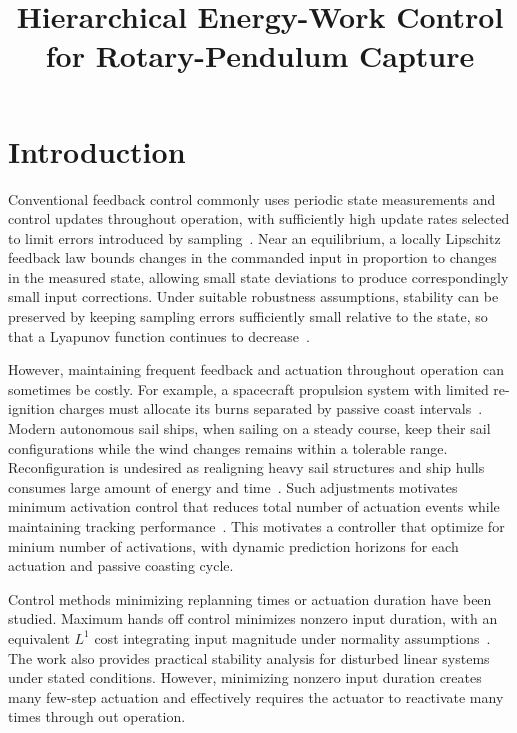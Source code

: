 \documentclass[letterpaper,10pt,conference]{ieeeconf}
\title{\bfseries Hierarchical Energy-Work Control for Rotary-Pendulum Capture}
\author{}
\begin{document}
\maketitle
\thispagestyle{empty}
\pagestyle{empty}

\section{Introduction}
Conventional feedback control commonly uses periodic state measurements and control updates throughout operation, with sufficiently high update rates selected to limit errors introduced by sampling~\cite{heemels2012}. Near an equilibrium, a locally Lipschitz feedback law bounds changes in the commanded input in proportion to changes in the measured state, allowing small state deviations to produce correspondingly small input corrections. Under suitable robustness assumptions, stability can be preserved by keeping sampling errors sufficiently small relative to the state, so that a Lyapunov function continues to decrease~\cite{tabuada2007}.

However, maintaining frequent feedback and actuation throughout operation can sometimes be costly. For example, a spacecraft propulsion system with limited re-ignition charges must allocate its burns separated by passive coast intervals~\cite{peyraud2023}. Modern autonomous sail ships, when sailing on a steady course, keep their sail configurations while the wind changes remains within a tolerable range. Reconfiguration is undesired as realigning heavy sail structures and ship hulls consumes large amount of energy and time~\cite{akiyama2021}. Such adjustments motivates minimum activation control that reduces total number of actuation events while maintaining tracking performance~\cite{sang2026}. This motivates a controller that optimize for minium number of activations, with dynamic prediction horizons for each actuation and passive coasting cycle.

Control methods minimizing replanning times or actuation duration have been studied. 
Maximum hands off control minimizes nonzero input duration, with an equivalent $L^1$ cost integrating input magnitude under normality assumptions~\cite{nagahara2015}. The work also provides practical stability analysis for disturbed linear systems under stated conditions. 
However, minimizing nonzero input duration creates many few-step actuation and effectively requires the actuator to reactivate many times through out operation.
\end{document}

